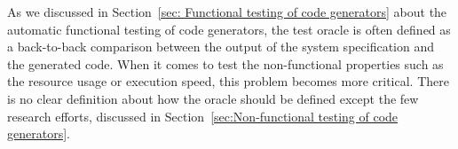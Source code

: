 As we discussed in Section~\ref{sec: Functional testing of code generators} about the automatic functional testing of code generators, the test oracle is often defined as a back-to-back comparison between the output of the system specification and the generated code.
When it comes to test the non-functional properties such as the resource usage or execution speed, this problem becomes more critical. There is no clear definition about how the oracle should be defined except the few research efforts, discussed in Section~\ref{sec:Non-functional testing of code generators}. 






